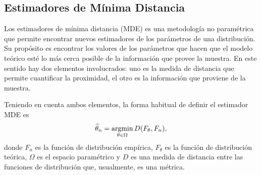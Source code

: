%





\subsection{Estimadores de Mínima Distancia}
\label{MDE}

Los estimadores de mínima distancia (MDE) es una metodología no paramétrica que permite encontrar nuevos estimadores de los parámetros de una distribución. Su propósito es encontrar los valores de los parámetros que hacen que el modelo teórico esté lo más cerca posible de la información que provee la muestra. En este sentido hay dos elementos involucrados: uno es la medida de distancia que permite cuantificar la proximidad, el otro es la información que proviene de la muestra. 

Teniendo en cuenta ambos elementos, la forma habitual de definir el estimador MDE es 
\begin{align}
\label{DistDistribucion}
\widehat{\theta}_n=\mathop{\rm argmin}\limits_{\theta\in\Omega} D(F_{\theta},F_n),
\end{align}
donde $F_n$ es la función de distribución empírica, $F_{\theta}$ es la función de distribución teórica, $\Omega$ es el espacio paramétrico y $D$ es una medida de distancia entre las funciones de distribución que, usualmente, es una métrica.

